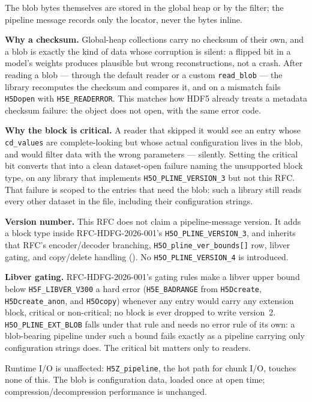 \documentclass[../RFC-HDFG-2026-003.tex]{subfiles}
\begin{document}
The blob bytes themselves are stored in the global heap or by the
filter; the pipeline message records only the locator, never the bytes
inline.

\textbf{Why a checksum.}  Global-heap collections carry no checksum of
their own, and a blob is exactly the kind of data whose corruption is
silent: a flipped bit in a model's weights produces plausible but wrong
reconstructions, not a crash.  After reading a blob --- through the
default reader or a custom \texttt{read\_blob} --- the library recomputes
the checksum and compares it, and on a mismatch fails \texttt{H5Dopen}
with \texttt{H5E\_READERROR}.  This matches how HDF5 already treats a
metadata checksum failure: the object does not open, with the same
error code.

\textbf{Why the block is critical.} A reader that skipped it would see an
entry whose \texttt{cd\_values} are complete-looking but whose actual
configuration lives in the blob, and would filter data with the wrong
parameters --- silently.  Setting the critical bit converts that into a
clean dataset-open failure naming the unsupported block type, on any
library that implements \texttt{H5O\_PLINE\_VERSION\_3} but not this RFC.
That failure is scoped to the entries that need the blob: such a library
still reads every other dataset in the file, including their
configuration strings.

\textbf{Version number.} This RFC does not claim a pipeline-message
version.  It adds a block type inside RFC-HDFG-2026-001's
\texttt{H5O\_PLINE\_VERSION\_3}, and inherits that RFC's
encoder/decoder branching, \texttt{H5O\_pline\_ver\_bounds[]} row, libver
gating, and copy/delete handling
().  No \texttt{H5O\_PLINE\_VERSION\_4}
is introduced.

\textbf{Libver gating.}  RFC-HDFG-2026-001's gating rules make a
libver upper bound below \texttt{H5F\_LIBVER\_V300} a hard error
(\texttt{H5E\_BADRANGE} from \texttt{H5Dcreate}, \texttt{H5Dcreate\_anon},
and \texttt{H5Ocopy}) whenever any entry would carry any extension block,
critical or non-critical; no block is ever dropped to write version~2.
\texttt{H5O\_PLINE\_EXT\_BLOB} falls under that rule and needs no error
rule of its own: a blob-bearing pipeline under such a bound fails exactly
as a pipeline carrying only configuration strings does.  The critical bit
matters only to readers.

Runtime I/O is unaffected: \texttt{H5Z\_pipeline}, the hot path for
chunk I/O, touches none of this. The blob is configuration data, loaded
once at open time; compression/decompression performance is unchanged.
\end{document}
